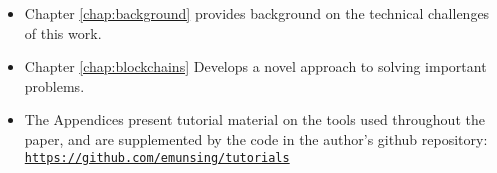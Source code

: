 \lipsum[4]

\begin{itemize}
	\item Chapter \ref{chap:background} provides background on the technical challenges of this work.
	\item Chapter \ref{chap:blockchains} Develops a novel approach to solving important problems.
	\item The Appendices present tutorial material on the tools used throughout the paper, and are supplemented by the code in the author's github repository: \texttt{\url{https://github.com/emunsing/tutorials}}
\end{itemize}

\lipsum[5-6]
